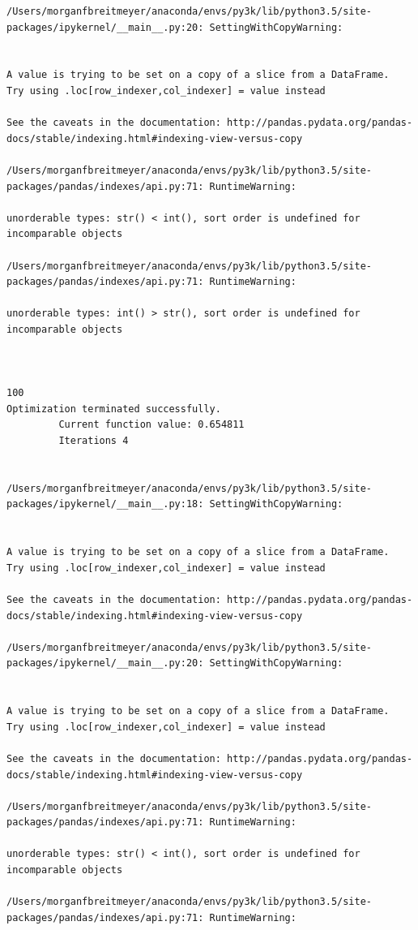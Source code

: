 \begin{lstlisting}
/Users/morganfbreitmeyer/anaconda/envs/py3k/lib/python3.5/site-packages/ipykernel/__main__.py:20: SettingWithCopyWarning:


A value is trying to be set on a copy of a slice from a DataFrame.
Try using .loc[row_indexer,col_indexer] = value instead

See the caveats in the documentation: http://pandas.pydata.org/pandas-docs/stable/indexing.html#indexing-view-versus-copy

/Users/morganfbreitmeyer/anaconda/envs/py3k/lib/python3.5/site-packages/pandas/indexes/api.py:71: RuntimeWarning:

unorderable types: str() < int(), sort order is undefined for incomparable objects

/Users/morganfbreitmeyer/anaconda/envs/py3k/lib/python3.5/site-packages/pandas/indexes/api.py:71: RuntimeWarning:

unorderable types: int() > str(), sort order is undefined for incomparable objects



100
Optimization terminated successfully.
         Current function value: 0.654811
         Iterations 4


/Users/morganfbreitmeyer/anaconda/envs/py3k/lib/python3.5/site-packages/ipykernel/__main__.py:18: SettingWithCopyWarning:


A value is trying to be set on a copy of a slice from a DataFrame.
Try using .loc[row_indexer,col_indexer] = value instead

See the caveats in the documentation: http://pandas.pydata.org/pandas-docs/stable/indexing.html#indexing-view-versus-copy

/Users/morganfbreitmeyer/anaconda/envs/py3k/lib/python3.5/site-packages/ipykernel/__main__.py:20: SettingWithCopyWarning:


A value is trying to be set on a copy of a slice from a DataFrame.
Try using .loc[row_indexer,col_indexer] = value instead

See the caveats in the documentation: http://pandas.pydata.org/pandas-docs/stable/indexing.html#indexing-view-versus-copy

/Users/morganfbreitmeyer/anaconda/envs/py3k/lib/python3.5/site-packages/pandas/indexes/api.py:71: RuntimeWarning:

unorderable types: str() < int(), sort order is undefined for incomparable objects

/Users/morganfbreitmeyer/anaconda/envs/py3k/lib/python3.5/site-packages/pandas/indexes/api.py:71: RuntimeWarning:


\end{lstlisting}
